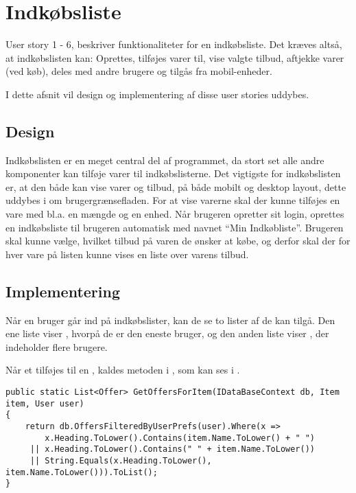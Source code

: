 \section{Indkøbsliste} \label{Indkoebsliste}
User story 1 - 6, beskriver funktionaliteter for en indkøbsliste.
Det kræves altså, at indkøbslisten kan: Oprettes, tilføjes varer til, vise valgte tilbud, aftjekke varer (ved køb), deles med andre brugere og tilgås fra mobil-enheder.

I dette afsnit vil design og implementering af disse user stories uddybes.

\subsection{Design}
Indkøbslisten er en meget central del af programmet, da stort set alle andre komponenter kan tilføje varer til indkøbslisterne.
Det vigtigste for indkøbslisten er, at den både kan vise varer og tilbud, på både mobilt og desktop layout, dette uddybes i  om brugergrænsefladen.
For at vise varerne skal der kunne tilføjes en vare med bl.a. en mængde og en enhed.
Når brugeren opretter sit login, oprettes en indkøbsliste til brugeren automatisk med navnet ``Min Indkøbliste''.
Brugeren skal kunne vælge, hvilket tilbud på varen de ønsker at købe, og derfor skal der for hver vare på listen kunne vises en liste over varens tilbud.

\subsection{Implementering}
Når en bruger går ind på indkøbslister, kan de se to lister af  de kan tilgå.
Den ene liste viser , hvorpå de er den eneste bruger, og den anden liste viser , der indeholder flere brugere.

Når et  tilføjes til en , kaldes metoden  i , som kan ses i .

\begin{lstlisting}[caption={Metoden \class{GetOffersForItem} finder relevante tilbud og returner dem som en liste}, label=getoffersforitem]
public static List<Offer> GetOffersForItem(IDataBaseContext db, Item item, User user)
{
    return db.OffersFilteredByUserPrefs(user).Where(x => 
     	x.Heading.ToLower().Contains(item.Name.ToLower() + " ") 
     || x.Heading.ToLower().Contains(" " + item.Name.ToLower()) 
     || String.Equals(x.Heading.ToLower(), item.Name.ToLower())).ToList();
}
\end{lstlisting}


